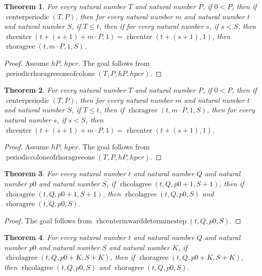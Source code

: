 \documentclass[11pt]{article}
\newtheorem{theorem}{Theorem}[section]
\theoremstyle{definition}
\begin{document}
\begin{theorem}
\label{ll:paper:periodic-rhoragree-one-of-col-one}
For every natural number \(T\) and natural number \(P\), if \(0 < P\), then if \(\operatorname{centerperiodic}(T, P)\), then for every natural number \(m\) and natural number \(t\) and natural number \(S\), if \(T \le t\), then if for every natural number \(s\), if \(s < S\), then \(\operatorname{rhcenter}(t + (s + 1) + m \cdot P, 1) = \operatorname{rhcenter}(t + (s + 1), 1)\), then \(\operatorname{rhoragree}(t, m \cdot P, 1, S)\).
\end{theorem}
\begin{proof}
Assume \(hP\), \(hper\).
The goal follows from \(\operatorname{periodicrhoragreeoneofcolone}(T, P, hP, hper)\).
\end{proof}
\begin{theorem}
\label{ll:paper:periodic-col-one-of-rhoragree-one}
For every natural number \(T\) and natural number \(P\), if \(0 < P\), then if \(\operatorname{centerperiodic}(T, P)\), then for every natural number \(m\) and natural number \(t\) and natural number \(S\), if \(T \le t\), then if \(\operatorname{rhoragree}(t, m \cdot P, 1, S)\), then for every natural number \(s\), if \(s < S\), then \(\operatorname{rhcenter}(t + (s + 1) + m \cdot P, 1) = \operatorname{rhcenter}(t + (s + 1), 1)\).
\end{theorem}
\begin{proof}
Assume \(hP\), \(hper\).
The goal follows from \(\operatorname{periodiccoloneofrhoragreeone}(T, P, hP, hper)\).
\end{proof}
\begin{theorem}
\label{ll:paper:rhcenter-inward-determine-step}
For every natural number \(t\) and natural number \(Q\) and natural number \(p0\) and natural number \(S\), if \(\operatorname{rhcolagree}(t, Q, p0 + 1, S + 1)\), then if \(\operatorname{rhoragree}(t, Q, p0 + 1, S + 1)\), then \(\operatorname{rhcolagree}(t, Q, p0, S)\) and \(\operatorname{rhoragree}(t, Q, p0, S)\).
\end{theorem}
\begin{proof}
The goal follows from \(\operatorname{rhcenterinwarddeterminestep}(t, Q, p0, S)\).
\end{proof}
\begin{theorem}
\label{ll:paper:rhcenter-inward-determine}
For every natural number \(t\) and natural number \(Q\) and natural number \(p0\) and natural number \(S\) and natural number \(K\), if \(\operatorname{rhcolagree}(t, Q, p0 + K, S + K)\), then if \(\operatorname{rhoragree}(t, Q, p0 + K, S + K)\), then \(\operatorname{rhcolagree}(t, Q, p0, S)\) and \(\operatorname{rhoragree}(t, Q, p0, S)\).
\end{theorem}
\end{document}
